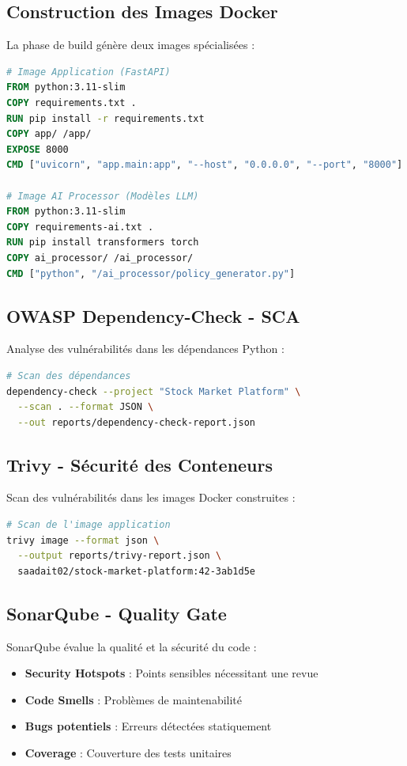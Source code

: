 \documentclass[12pt,a4paper]{report}
\begin{document}
\subsection{Construction des Images Docker}

La phase de build génère deux images spécialisées :

\begin{lstlisting}[language=dockerfile]
# Image Application (FastAPI)
FROM python:3.11-slim
COPY requirements.txt .
RUN pip install -r requirements.txt
COPY app/ /app/
EXPOSE 8000
CMD ["uvicorn", "app.main:app", "--host", "0.0.0.0", "--port", "8000"]

# Image AI Processor (Modèles LLM)
FROM python:3.11-slim
COPY requirements-ai.txt .
RUN pip install transformers torch
COPY ai_processor/ /ai_processor/
CMD ["python", "/ai_processor/policy_generator.py"]
\end{lstlisting}

\subsection{OWASP Dependency-Check - SCA}

Analyse des vulnérabilités dans les dépendances Python :
\begin{lstlisting}[language=bash]
# Scan des dépendances
dependency-check --project "Stock Market Platform" \
  --scan . --format JSON \
  --out reports/dependency-check-report.json
\end{lstlisting}

\subsection{Trivy - Sécurité des Conteneurs}

Scan des vulnérabilités dans les images Docker construites :
\begin{lstlisting}[language=bash]
# Scan de l'image application
trivy image --format json \
  --output reports/trivy-report.json \
  saadait02/stock-market-platform:42-3ab1d5e
\end{lstlisting}

\subsection{SonarQube - Quality Gate}

SonarQube évalue la qualité et la sécurité du code :
\begin{itemize}
    \item \textbf{Security Hotspots} : Points sensibles nécessitant une revue
    \item \textbf{Code Smells} : Problèmes de maintenabilité
    \item \textbf{Bugs potentiels} : Erreurs détectées statiquement
    \item \textbf{Coverage} : Couverture des tests unitaires
\end{itemize}
\end{document}
